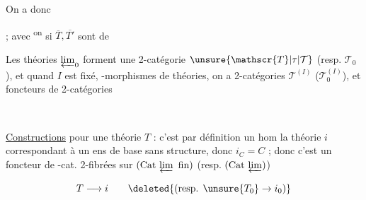 
On a donc


; avec \textsuperscript{on}  \unsure{$\simeq$|---} si $\overline{T},\overline{T'}$ sont de  

Les théories  $\varprojlim_0$  forment une 2-catégorie  $\unsure{\mathscr{T}|\tau|\mathcal{T}}$ (resp. $\mathscr{T}_0$), et quand $I$ est fixé,   -morphismes de théories, on a  2-catégories $\mathscr{T}^{(I)}$ ($\mathscr{T}_0^{(I)}$), et   foncteurs de 2-catégories


\\

\uline{Constructions}  pour une  théorie $T$ : c'est par définition un hom  la théorie $i$  correspondant à un ens de base sans structure, donc $i_C=C$ ; donc c'est un foncteur de -cat. 2-fibrées sur $(\mathrm{Cat}\,\varprojlim\ \text{fin})$ (resp. $(\mathrm{Cat}\,\varprojlim)$)

\[T\longrightarrow i\qquad\deleted{(\text{resp. }\unsure{T_0}\to i_0)}\]

